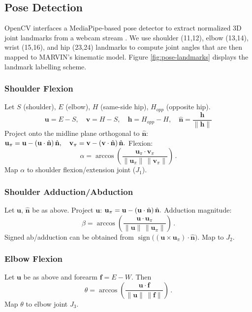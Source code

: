 \documentclass[acmsmall, screen]{acmart}
\begin{document}
\subsection{Pose Detection}
OpenCV interfaces a MediaPipe-based pose detector to extract normalized 3D joint landmarks from a webcam stream \cite{noauthor_mediapipe_nodate}. We use shoulder (11,12), elbow (13,14), wrist (15,16), and hip (23,24) landmarks to compute joint angles that are then mapped to MARVIN's kinematic model. Figure \ref{fig:pose-landmarks} displays the landmark labelling scheme.

\subsubsection{Shoulder Flexion}
Let $S$ (shoulder), $E$ (elbow), $H$ (same-side hip), $H_{opp}$ (opposite hip).
\begin{displaymath}
  \mathbf{u}=E-S,\quad \mathbf{v}=H-S,\quad \mathbf{h}=H_{opp}-H,\quad \hat{\mathbf{n}}=\frac{\mathbf{h}}{\lVert\mathbf{h}\rVert}
\end{displaymath}
Project onto the midline plane orthogonal to $\hat{\mathbf{n}}$:
$
\mathbf{u}_\pi=\mathbf{u}-(\mathbf{u}\cdot\hat{\mathbf{n}})\,\hat{\mathbf{n}},\quad
\mathbf{v}_\pi=\mathbf{v}-(\mathbf{v}\cdot\hat{\mathbf{n}})\,\hat{\mathbf{n}}. \\
$
Flexion:
\begin{equation}
\alpha=\arccos \!\left( \frac{\mathbf{u}_\pi \cdot \mathbf{v}_\pi}{\lVert\mathbf{u}_\pi\rVert\, \lVert\mathbf{v}_\pi\rVert} \right)\,.
\end{equation}
Map $\alpha$ to shoulder flexion/extension joint ($J_1$).

\subsubsection{Shoulder Adduction/Abduction}
Let $\mathbf{u}$, $\hat{\mathbf{n}}$ be as above. Project $\mathbf{u}$:
$
\mathbf{u}_\pi=\mathbf{u}-(\mathbf{u}\cdot\hat{\mathbf{n}})\,\hat{\mathbf{n}}.\\
$
Adduction magnitude:
\begin{equation}
\beta=\arccos \!\left( \frac{\mathbf{u}\cdot\mathbf{u}_\pi}{\lVert\mathbf{u}\rVert\, \lVert\mathbf{u}_\pi\rVert} \right)\,.
\end{equation}
Signed ab/adduction can be obtained from $\operatorname{sign}\big((\mathbf{u}\times\mathbf{u}_\pi)\cdot\hat{\mathbf{n}}\big)$. Map to $J_2$.

\subsubsection{Elbow Flexion}
Let $\mathbf{u}$ be as above and forearm $\mathbf{f}=E-W$. Then
\begin{equation}
\theta=\arccos \!\left( \frac{\mathbf{u}\cdot\mathbf{f}}{\lVert\mathbf{u}\rVert\, \lVert\mathbf{f}\rVert} \right)\,.
\end{equation}
Map $\theta$ to elbow joint $J_3$.
\end{document}
